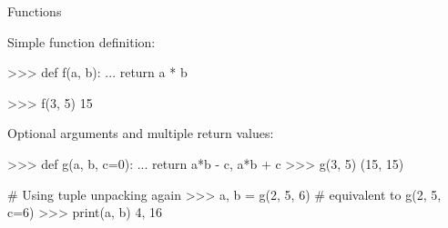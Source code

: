 \documentclass[10pt]{beamer}
\begin{document}
\begin{frame}[fragile]{Functions}

    Simple function definition:

    \begin{pythoncode}
        >>> def f(a, b):
        ...     return a * b

        >>> f(3, 5)
        15
    \end{pythoncode}

    \pause

    Optional arguments and multiple return values:

    \begin{pythoncode}
        >>> def g(a, b, c=0):
        ...     return a*b - c, a*b + c
        >>> g(3, 5)
        (15, 15)

        # Using tuple unpacking again
        >>> a, b = g(2, 5, 6)  # equivalent to g(2, 5, c=6)
        >>> print(a, b)
        4, 16
    \end{pythoncode}

\end{frame}


%
%
%
%
%
%

\end{document}
